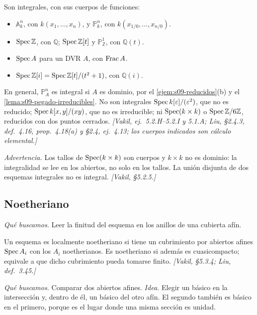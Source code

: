 \begin{ejem}
\label{ejem:s09-integrales}
Son integrales, con sus cuerpos de funciones:
\begin{itemize}
\item $\mathbb A^n_k$, con $k(x_1,\ldots,x_n)$, y $\mathbb P^n_k$, con $k(x_{1/0},\ldots,x_{n/0})$.
\item $\operatorname{Spec}\mathbb Z$, con $\mathbb Q$; $\operatorname{Spec}\mathbb Z[t]$ y $\mathbb P^1_{\mathbb Z}$, con $\mathbb Q(t)$.
\item $\operatorname{Spec} A$ para un DVR $A$, con $\operatorname{Frac} A$.
\item $\operatorname{Spec}\mathbb Z[i]=\operatorname{Spec}\mathbb Z[t]/(t^2+1)$, con $\mathbb Q(i)$.
\end{itemize}
En general, $\mathbb P^n_A$ es integral si $A$ es dominio, por el \cref{ejem:s09-reducidos}(b) y el \cref{lema:s09-pegado-irreducibles}. No son integrales $\operatorname{Spec} k[\varepsilon]/(\varepsilon^2)$, que no es reducido; $\operatorname{Spec} k[x,y]/(xy)$, que no es irreducible; ni $\operatorname{Spec}(k\times k)$ o $\operatorname{Spec}\mathbb Z/6\mathbb Z$, reducidos con dos puntos cerrados. \emph{[Vakil, ej.~5.2.H--5.2.I y 5.1.A; Liu, \S2.4.3, def.~4.16, prop.~4.18(a) y \S2.4, ej.~4.13; los cuerpos indicados son cálculo elemental.]}
\end{ejem}
\emph{Advertencia.} Los tallos de $\operatorname{Spec}(k\times k)$ son cuerpos y $k\times k$ no es dominio: la integralidad se lee en los abiertos, no solo en los tallos. La unión disjunta de dos esquemas integrales no es integral. \emph{[Vakil, \S5.2.5.]}

\subsection{Noetheriano}
\emph{Qué buscamos.} Leer la finitud del esquema en los anillos de una cubierta afín.

\begin{defi}
\label{defi:s09-esquema-noetheriano}
Un esquema es localmente noetheriano si tiene un cubrimiento por abiertos afines $\operatorname{Spec} A_i$ con los $A_i$ noetherianos. Es noetheriano si además es cuasicompacto; equivale a que dicho cubrimiento pueda tomarse finito. \emph{[Vakil, \S5.3.4; Liu, def.~3.45.]}
\end{defi}

\emph{Qué buscamos.} Comparar dos abiertos afines. \emph{Idea.} Elegir un básico en la intersección y, dentro de él, un básico del otro afín. El segundo también es básico en el primero, porque es el lugar donde una misma sección es unidad.

